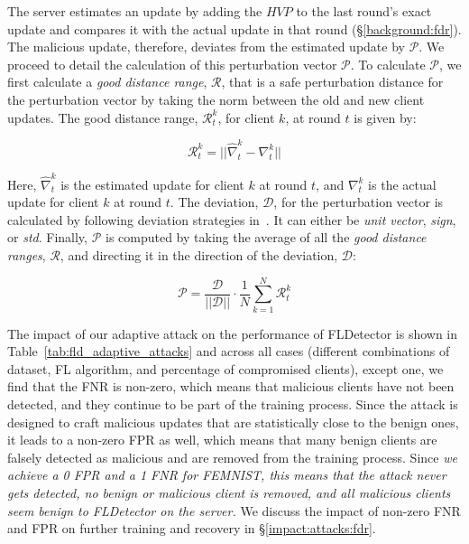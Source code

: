 The server estimates an update by adding the $HVP$ to the last round's exact update and compares it with the actual update in that round (\S\ref{background:fdr}). The malicious update, therefore, deviates from the estimated update by $\mathcal{P}$. We proceed to detail the calculation of this perturbation vector $\mathcal{P}$. To calculate $\mathcal{P}$, we first calculate a \emph{good distance range}, $\mathcal{R}$, that is a safe perturbation distance for the perturbation vector by taking the norm between the old and new client updates. The good distance range, $\mathcal{R}_{t}^{k}$, for client $k$, at round $t$ is given by:


\begin{equation}\label{eqn:fld_good_distance}
    \mathcal{R}_{t}^{k} = ||\hat{\nabla}_{t}^{k} - \nabla_{t}^{k}||
\end{equation}

Here, $\hat{\nabla}_{t}^{k}$ is the estimated update for client $k$ at round $t$, and $\nabla_{t}^{k}$ is the actual update for client $k$ at round $t$.
The deviation, $\mathcal{D}$, for the perturbation vector is calculated by following deviation strategies in~\cite{shejwalkar2021manipulating}. It can either be \textit{unit vector}, \textit{sign}, or \textit{std}. Finally, $\mathcal{P}$ is computed by taking the average of all the \textit{good distance ranges}, $\mathcal{R}$, and directing it in the direction of the deviation, $\mathcal{D}$:


\begin{equation}\label{eqn:fld_perturbation}
    \mathcal{P} = \frac{\mathcal{D}}{||\mathcal{D}||}\cdot\frac{1}{N}\sum_{k=1}^{N} \mathcal{R}_{t}^{k}
\end{equation}


The impact of our adaptive attack on the performance of FLDetector is shown in Table~\ref{tab:fld_adaptive_attacks} and across all cases (different combinations of dataset, FL algorithm, and percentage of compromised clients), except one, we find that the FNR is non-zero, which means that malicious clients have not been detected, and they continue to be part of the training process. Since the attack is designed to craft malicious updates that are statistically close to the benign ones, it leads to a non-zero FPR as well, which means that many benign clients are falsely detected as malicious and are removed from the training process.
Since \emph{we achieve a 0 FPR and a 1 FNR for FEMNIST, this means that the attack never gets detected, no benign or malicious client is removed, and all malicious clients seem benign to FLDetector on the server.} We discuss the impact of non-zero FNR and FPR on further training and recovery in \S\ref{impact:attacks:fdr}.

